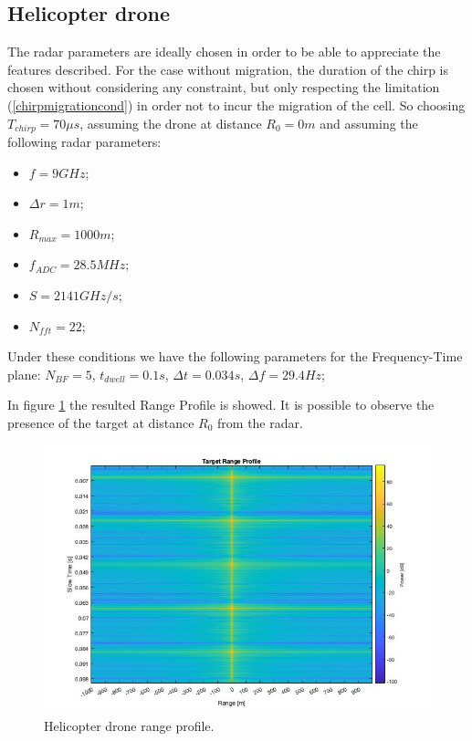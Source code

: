 \subsection{Helicopter drone}
The radar parameters are ideally chosen in order to be able to appreciate the features described. For the case without migration, the duration of the chirp is chosen without considering any constraint, but only respecting the limitation (\ref{chirpmigrationcond}) in order not to incur the migration of the cell. So choosing $T_{chirp} = 70 \mu s$, assuming the drone at distance $R_0 = 0 m$ and assuming the following radar parameters:
\begin{itemize}
    \item $f = 9 GHz$;
    
    \item $\Delta r = 1 m$;
         
    \item $R_{max} = 1000 m$;

    \item $f_{ADC} = 28.5 MHz$;
    
    \item $S = 2141 GHz/s$;
    
    \item $N_{fft} = 22 $;
    
\end{itemize}
Under these conditions we have the following parameters for the Frequency-Time plane: $N_{BF} = 5$, $t_{dwell} = 0.1 s$, $\Delta t = 0.034 s$, $\Delta f = 29.4 Hz$;

In figure \ref{helicrangeprofile} the resulted Range Profile is showed.
It is possible to observe the presence of the target at distance $R_0$ from the radar.

\begin{figure}[h!]
\centering
\includegraphics[width=12cm]{FMCW mD analysis-chap4/img/helic_range_profile_example.jpg}
\caption{Helicopter drone range profile.}
\label{helicrangeprofile}
\end{figure}

